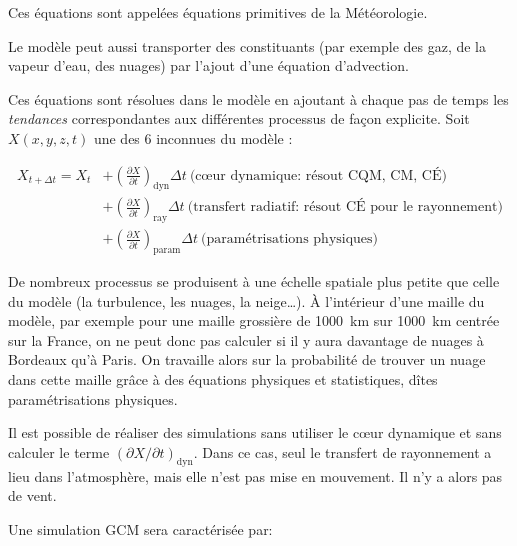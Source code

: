 \documentclass[a4paper,12pt]{article}
\begin{document}
Ces équations sont appelées équations primitives de la Météorologie.

Le modèle peut aussi transporter des constituants (par exemple des gaz, de la
vapeur d'eau, des nuages) par l'ajout d'une équation d'advection.

Ces équations sont résolues dans le modèle en ajoutant à chaque pas de temps
les \emph{tendances} correspondantes aux différentes processus de façon
explicite. Soit $X(x,y,z,t)$ une des 6 inconnues du modèle :

\begin{align}
X_{t+\Delta t} = X_t & + \left( \frac{\partial X}{\partial t} \right)_
{\text{dyn}} \Delta t \ \text{(c\oe ur dynamique: résout CQM, CM, C\'E)} \\
& + \left( \frac{\partial X}{\partial t} \right)_{\text{ray}} \Delta t \
\text{(transfert radiatif: résout C\'E pour le rayonnement)} \\
& + \left( \frac{\partial X}{\partial t} \right)_{\text{param}} \Delta t \
\text{(paramétrisations physiques)}
\end{align}

De nombreux processus se produisent à une échelle spatiale plus petite que
celle du modèle (la turbulence, les nuages, la neige\dots). \`A l'intérieur
d'une maille du modèle, par exemple pour une maille grossière de 1000~km sur
1000~km centrée sur la France, on ne peut donc pas calculer si il y aura
davantage de nuages à Bordeaux qu'à Paris. On travaille alors sur la
probabilité de trouver un nuage dans cette maille grâce à des équations
physiques et statistiques, dîtes paramétrisations physiques.

Il est possible de réaliser des simulations sans utiliser le c\oe ur dynamique
et sans calculer le terme $(\partial X / \partial t)_\text{dyn}$. Dans ce cas,
seul le transfert de rayonnement a lieu dans l'atmosphère, mais elle n'est pas
mise en mouvement. Il n'y a alors pas de vent.

\medskip

Une simulation GCM sera caractérisée par:
\end{document}
